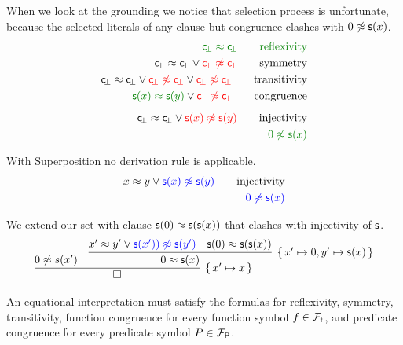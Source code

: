 \begin{example} When we look at the grounding we notice that selection process is unfortunate,
	because the selected literals of any clause but congruence clashes with $0\not\approx{\mathsf s}(x)$.
	\begin{align*}
	\colHi \consbot \mEQ \consbot
	\tag*{reflexivity}\\
	{ \consbot \mEQ \consbot} \lor {\colLo \consbot \mNE \consbot}
	\tag*{symmetry}\\
	{ \consbot \mEQ \consbot} 
	\lor {\colLo \consbot \mNE \consbot} 
	\lor {\colLo \consbot\mNE \consbot}
	\tag*{transitivity}\\
	{\colHi \msucc(x) \mEQ \msucc(y)} \lor {\colLo \consbot \mNE \consbot}
	\tag*{congruence}\\[0.5em]
	{ \consbot \mEQ \consbot} \lor {\colLo \msucc(x) \mNE \msucc(y)}
	\tag*{injectivity}\\
	{\colHi 0 \mNE \msucc(x)}
	\end{align*}
\end{example}



\begin{example} With Superposition no derivation rule is applicable.
	\begin{align*}
	x \mEQ y \lor {\colN \msucc(x) \mNE \msucc(y)}
	\tag*{injectivity}\\
	{\colN 0 \mNE \msucc(x)}
	\end{align*}
\end{example}

\begin{example} We extend our set with clause ${\mathsf s}(0) \approx {\mathsf s}({\mathsf s}(x))$ 
	that clashes with injectivity of ${\mathsf s}$.
	\begin{gather*}
	\infer[\{\,x'\mapsto x\,\}]
	{\square}
	{0\mNE s(x') &
	\infer[
	\{\, x'\mapsto 0, y'\mapsto\msucc(x) \,\}
	]{
		0 \mEQ \msucc(x)	
	}{
		x' \mEQ y' \lor {\colN \msucc(x')) \mNE \msucc(y')} 
		& {\msucc(0) \mEQ \msucc(\msucc(x))}
	}
}
	\end{gather*}
\end{example}


	An equational interpretation must satisfy the formulas for reflexivity, symmetry, transitivity, 
	function congruence for every function symbol $f\in{{\mathcal F}_{\mathsf f}}$, 
	and predicate congruence for every predicate symbol $P\in{{\mathcal F}_{\mathsf P}}$.

%

